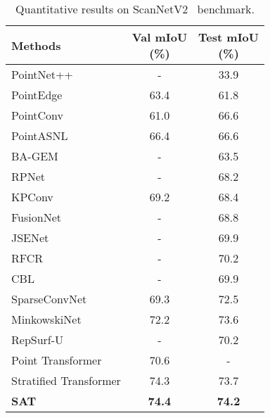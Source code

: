 \documentclass[10pt,twocolumn,letterpaper]{article}
\begin{document}
\begin{table}
\begin{center}
\begin{tabular}{l|c|c}
\toprule
Methods                         & \makecell[c]{Val mIoU \\(\%)}                    &\makecell[c]{Test mIoU \\(\%)} \\ 
\midrule
PointNet++\cite{pointnet2}           & -            & 33.9 \\ 
PointEdge\cite{pointedge2019}            & 63.4             & 61.8 \\ 
PointConv\cite{pointconv}            & 61.0             & 66.6 \\ 
PointASNL\cite{pointasnl} & 66.4             & 66.6 \\ 
BA-GEM\cite{boundary-aware2021} &     -       & 63.5      \\
RPNet\cite{rpnet2021}            & -             & 68.2 \\ 
KPConv\cite{kpconv}            & 69.2             & 68.4 \\ 
FusionNet\cite{fusionnet2020}           & -             & 68.8 \\ 
JSENet\cite{jsenet2020}           & -             & 69.9 \\ 
RFCR\cite{rfcr2021}            & -               & 70.2 \\ 
CBL\cite{cbl2022}            & -             & 69.9 \\ 
SparseConvNet\cite{SparseConvNet2018}            & 69.3                & 72.5 \\ 
MinkowskiNet\cite{Minkowski2019}             & 72.2             & 73.6 \\ 
RepSurf-U\cite{repsurf2022}            &  -                  & 70.2     \\
Point Transformer\cite{pt2021} & 70.6               & - \\ 
Stratified Transformer\cite{strTransformer} & 74.3      & 73.7 \\
\midrule
\textbf{SAT}          &    \textbf{74.4}       & \textbf{74.2}      \\
\bottomrule
\end{tabular}
\end{center}
\caption{Quantitative results on ScanNetV2~\cite{datasetscannet} benchmark.}
\label{tbl-scannet}
\end{table}
\end{document}
